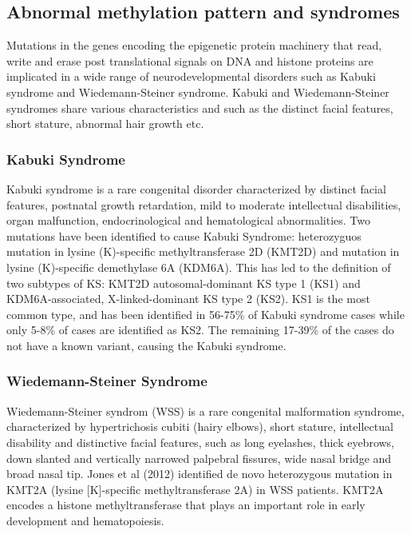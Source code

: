 
\subsection{Abnormal methylation pattern and syndromes}
\label{sec:background:abnormal-met}
Mutations in the genes encoding the epigenetic protein machinery that read, write and erase post translational signals on DNA and histone proteins are implicated in a wide range of neurodevelopmental disorders such as Kabuki syndrome and Wiedemann-Steiner syndrome. Kabuki and Wiedemann-Steiner syndromes share various characteristics and such as the distinct facial features, short stature, abnormal hair growth etc.


\subsubsection{Kabuki Syndrome}
\label{sec:background:Kabuki-syndrome}
Kabuki syndrome is a rare congenital disorder characterized by distinct facial features, postnatal growth retardation, mild to moderate intellectual disabilities, organ malfunction, endocrinological and hematological abnormalities. Two mutations have been identified to cause Kabuki Syndrome: heterozyguos mutation in lysine (K)-specific methyltransferase 2D (KMT2D) and mutation in lysine (K)-specific demethylase 6A (KDM6A). This has led to the definition of two subtypes of KS: KMT2D autosomal-dominant KS type 1 (KS1) and KDM6A-associated, X-linked-dominant KS type 2 (KS2). KS1 is the most common type, and has been identified in 56-75\% of Kabuki syndrome cases while only 5-8\% of cases are identified as KS2. The remaining 17-39\% of the cases do not have a known variant, causing the Kabuki syndrome. \cite{bogershausen2016mutation}

\subsubsection{Wiedemann-Steiner Syndrome}
\label{sec:background:Wiedemann-Steiner}
Wiedemann-Steiner syndrom (WSS) is a rare congenital malformation syndrome, characterized by hypertrichosis cubiti (hairy elbows), short stature, intellectual disability and distinctive facial features, such as long eyelashes, thick eyebrows, down slanted and vertically narrowed palpebral fissures, wide nasal bridge and broad nasal tip. \cite{miyake2016delineation} Jones et al (2012) identified de novo heterozygous mutation in KMT2A (lysine [K]-specific methyltransferase 2A) in WSS patients. KMT2A encodes a histone methyltransferase that plays an important role in early development and hematopoiesis.\cite{jones2012novo}


